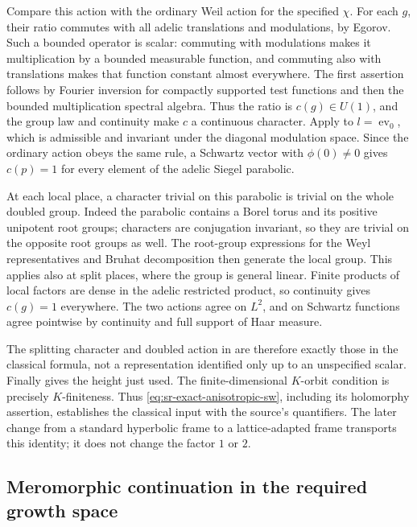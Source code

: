 Compare this action with the ordinary Weil action for
the specified \(\chi\).
For each \(g\), their ratio commutes with all adelic
translations and modulations, by Egorov.
Such a bounded operator is scalar: commuting with
modulations makes it multiplication by a bounded
measurable function, and commuting also with
translations makes that function constant almost
everywhere.
The first assertion follows by Fourier inversion for
compactly supported test functions and then the
bounded multiplication spectral algebra.
Thus the ratio is \(c(g)\in U(1)\), and the group law
and continuity make \(c\) a continuous character.
Apply  to
\(l=\operatorname{ev}_0\), which is admissible and
invariant under the diagonal modulation space.
Since the ordinary action obeys the same rule, a
Schwartz vector with \(\phi(0)\ne0\) gives \(c(p)=1\)
for every element of the adelic Siegel parabolic.

At each local place, a character trivial on this
parabolic is trivial on the whole doubled group.
Indeed the parabolic contains a Borel torus and its
positive unipotent root groups; characters are
conjugation invariant, so they are trivial on the
opposite root groups as well.
The root-group expressions for the Weyl
representatives and Bruhat decomposition then
generate the local group.
This applies also at split places, where the group
is general linear.
Finite products of local factors are dense in the
adelic restricted product, so continuity gives
\(c(g)=1\) everywhere.
The two actions agree on \(L^2\), and on Schwartz
functions agree pointwise by continuity and full
support of Haar measure.

The splitting character and doubled action in
 are therefore exactly those in the
classical formula, not a representation identified
only up to an unspecified scalar.
Finally  gives the height just used.
The finite-dimensional \(K\)-orbit condition is precisely
\(K\)-finiteness.
Thus \eqref{eq:sr-exact-anisotropic-sw}, including its
holomorphy assertion, establishes the classical input
 with the source's quantifiers.
The later change from a standard hyperbolic frame to a
lattice-adapted frame transports this identity; it does not
change the factor \(1\) or \(2\).

\subsection{Meromorphic continuation in the required growth space}

